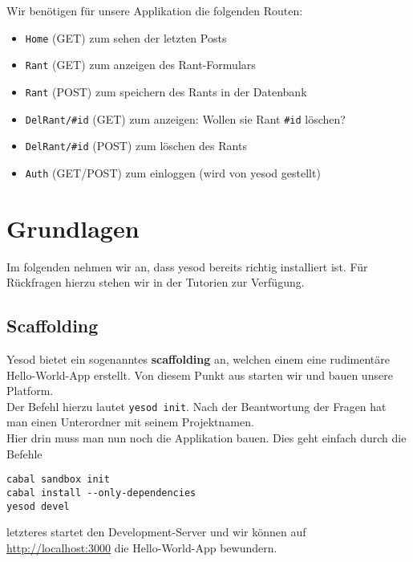 \documentclass{beamer}
\begin{document}
\begin{frame}[fragile]
Wir benötigen für unsere Applikation die folgenden Routen:\pause
\begin{itemize}
 \item \texttt{Home} (GET) zum sehen der letzten Posts
 \pause
 \item \texttt{Rant} (GET) zum anzeigen des Rant-Formulars
 \pause
 \item \texttt{Rant} (POST) zum speichern des Rants in der Datenbank
 \pause
 \item \texttt{DelRant/\#id} (GET) zum anzeigen: Wollen sie Rant \texttt{\#id} löschen?
 \pause
 \item \texttt{DelRant/\#id} (POST) zum löschen des Rants
 \pause
 \item \texttt{Auth} (GET/POST) zum einloggen (wird von yesod gestellt)
\end{itemize}

\end{frame}


\section{Grundlagen}

\begin{frame}
Im folgenden nehmen wir an, dass yesod bereits richtig installiert ist. Für Rückfragen hierzu stehen wir in der Tutorien zur Verfügung.
\end{frame}

\subsection{Scaffolding}

\begin{frame}[fragile]
Yesod bietet ein sogenanntes \textbf{scaffolding} an, welchen einem eine rudimentäre Hello-World-App erstellt. Von diesem Punkt aus starten wir und bauen unsere Platform.\\\pause
Der Befehl hierzu lautet \texttt{yesod init}. Nach der Beantwortung der Fragen hat man einen Unterordner mit seinem Projektnamen.\\\pause
Hier drin muss man nun noch die Applikation bauen. Dies geht einfach durch die Befehle
\begin{verbatim}
cabal sandbox init
cabal install --only-dependencies
yesod devel
\end{verbatim}
\pause
letzteres startet den Development-Server und wir können auf \url{http://localhost:3000} die Hello-World-App bewundern.
\end{frame}
\end{document}
